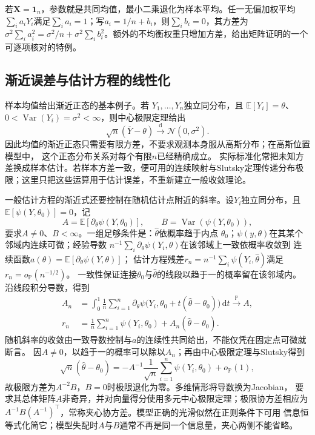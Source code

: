 若\(\bm X=\bm1_n\)，参数就是共同均值，最小二乘退化为样本平均。任一无偏加权平均\(\sum_i a_iY_i\)满足\(\sum_i a_i=1\)；写\(a_i=1/n+b_i\)，则\(\sum_i b_i=0\)，其方差为
\(\sigma^2\sum_i a_i^2=\sigma^2/n+\sigma^2\sum_i b_i^2\)。额外的不均衡权重只增加方差，给出矩阵证明的一个可逐项核对的特例。
\subsection{渐近误差与估计方程的线性化}
样本均值给出渐近正态的基本例子。若
\(Y_1,\ldots,Y_n\)独立同分布，且
\(\mathbb{E}[Y_i]=\theta\)、
\(0<\operatorname{Var}(Y_i)=\sigma^2<\infty\)，则中心极限定理给出
\[
  \sqrt n(\overline Y-\theta)
  \xrightarrow{\mathrm d}\mathcal N(0,\sigma^2).
\]
因此均值的渐近正态只需要有限方差，不要求观测本身服从高斯分布；在高斯位置模型中，
这个正态分布关系对每个有限\(n\)已经精确成立。
实际标准化常把未知方差换成样本估计。若样本方差一致，便可用的连续映射与Slutsky定理传递分布极限；这里只把这些运算用于估计误差，不重新建立一般收敛理论。

一般估计方程的渐近式还要控制在随机估计点附近的斜率。设\(Y_i\)独立同分布，且
\(\mathbb{E}[\psi(Y,\theta_0)]=0\)，记
\[
  A=\mathbb{E}[\partial_\theta\psi(Y,\theta_0)],
  \qquad B=\operatorname{Var}(\psi(Y,\theta_0)),
\]
要求\(A\neq0\)、\(B<\infty\)。一组足够条件是：\(\widehat\theta\)依概率趋于内点
\(\theta_0\)；\(\psi(y,\theta)\)在其某个邻域内连续可微；经验导数
\(n^{-1}\sum_i\partial_\theta\psi(Y_i,\theta)\)在该邻域上一致依概率收敛到
连续函数\(a(\theta)=\mathbb E[\partial_\theta\psi(Y,\theta)]\)；
估计方程残差\(r_n=n^{-1}\sum_i\psi(Y_i,\widehat\theta)\)满足
\(r_n=o_{\mathbb P}(n^{-1/2})\)。
一致性保证连接\(\theta_0\)与\(\widehat\theta\)的线段以趋于一的概率留在该邻域内。
沿线段积分导数，得到
\[
\begin{aligned}
 A_n&=\int_0^1\frac1n\sum_{i=1}^n
  \partial_\theta\psi\bigl(Y_i,\theta_0+t(\widehat\theta-\theta_0)\bigr)\,\mathrm dt
  \xrightarrow{\mathbb P}A,\\
 r_n&=\frac1n\sum_{i=1}^n\psi(Y_i,\theta_0)+A_n(\widehat\theta-\theta_0).
\end{aligned}
\]
随机斜率的收敛由一致导数控制与\(a\)的连续性共同给出，不能仅凭在固定点可微就断言。
因\(A\neq0\)，以趋于一的概率可以除以\(A_n\)；再由中心极限定理与Slutsky得到
\[
  \sqrt n(\widehat\theta-\theta_0)
  =
  -A^{-1}\frac1{\sqrt n}\sum_{i=1}^n\psi(Y_i,\theta_0)
  +o_{\mathbb{P}}(1),
\]
故极限方差为\(A^{-2}B\)，\(B=0\)时极限退化为零。多维情形将导数换为Jacobian，
要求其总体矩阵\(A\)非奇异，并对向量得分使用多元中心极限定理；极限协方差相应为
\(A^{-1}B(A^{-1})^\top\)，常称夹心协方差。模型正确的光滑似然在正则条件下可用
信息恒等式化简它；模型失配时\(A\)与\(B\)通常不再是同一个信息量，夹心两侧不能省略。

